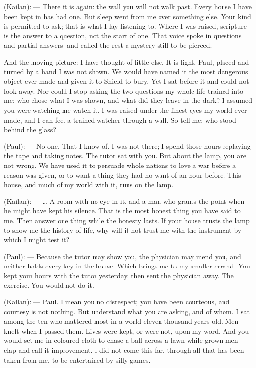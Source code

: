 \begin{room}
(Kailan): --- There it is again: the wall you will not walk past. Every house I have been kept in has had one. But sleep went from me over something else. Your kind is permitted to ask; that is what I lay listening to. Where I was raised, scripture is the answer to a question, not the start of one. That voice spoke in questions and partial answers, and called the rest a mystery still to be pierced.

And the moving picture: I have thought of little else. It is light, Paul, placed and turned by a hand I was not shown. We would have named it the most dangerous object ever made and given it to Shield to bury. Yet I sat before it and could not look away. Nor could I stop asking the two questions my whole life trained into me: who chose what I was shown, and what did they leave in the dark? I assumed you were watching me watch it. I was raised under the finest eyes my world ever made, and I can feel a trained watcher through a wall. So tell me: who stood behind the glass?

(Paul): --- No one. That I know of. I was not there; I spend those hours replaying the tape and taking notes. The tutor sat with you. But about the lamp, you are not wrong. We have used it to persuade whole nations to love a war before a reason was given, or to want a thing they had no want of an hour before. This house, and much of my world with it, runs on the lamp.

(Kailan): --- \ldots{} A room with no eye in it, and a man who grants the point when he might have kept his silence. That is the most honest thing you have said to me. Then answer one thing while the honesty lasts. If your house trusts the lamp to show me the history of life, why will it not trust me with the instrument by which I might test it?

(Paul): --- Because the tutor may show you, the physician may mend you, and neither holds every key in the house. Which brings me to my smaller errand. You kept your hours with the tutor yesterday, then sent the physician away. The exercise. You would not do it.

(Kailan): --- Paul. I mean you no disrespect; you have been courteous, and courtesy is not nothing. But understand what you are asking, and of whom. I sat among the ten who mattered most in a world eleven thousand years old. Men knelt when I passed them. Lives were kept, or were not, upon my word. And you would set me in coloured cloth to chase a ball across a lawn while grown men clap and call it improvement. I did not come this far, through all that has been taken from me, to be entertained by silly games.


\end{room}
